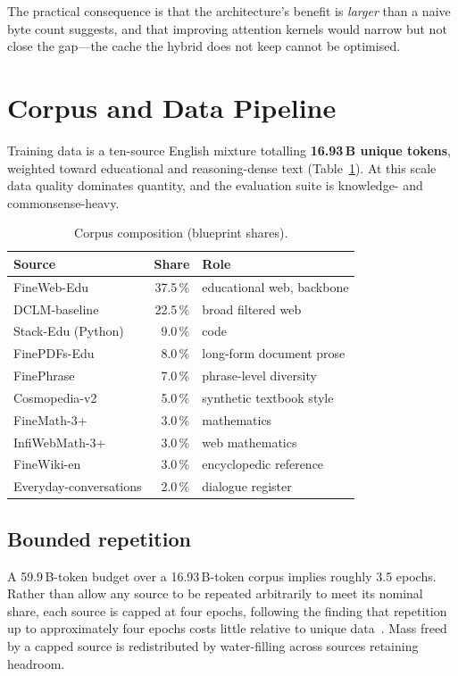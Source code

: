 \documentclass[conference]{IEEEtran}
\begin{document}
The practical consequence is that the architecture's benefit is
\emph{larger} than a naive byte count suggests, and that improving attention
kernels would narrow but not close the gap---the cache the hybrid does not keep
cannot be optimised.

\section{Corpus and Data Pipeline}

Training data is a ten-source English mixture totalling \textbf{16.93\,B unique
tokens}, weighted toward educational and reasoning-dense text
(Table~\ref{tab:corpus}). At this scale data quality dominates quantity, and the
evaluation suite is knowledge- and commonsense-heavy.

\begin{table}[t]
\caption{Corpus composition (blueprint shares).}
\label{tab:corpus}
\centering
\begin{tabular}{@{}lrl@{}}
\toprule
\textbf{Source} & \textbf{Share} & \textbf{Role} \\
\midrule
FineWeb-Edu            & 37.5\,\% & educational web, backbone \\
DCLM-baseline          & 22.5\,\% & broad filtered web \\
Stack-Edu (Python)     & 9.0\,\%  & code \\
FinePDFs-Edu           & 8.0\,\%  & long-form document prose \\
FinePhrase             & 7.0\,\%  & phrase-level diversity \\
Cosmopedia-v2          & 5.0\,\%  & synthetic textbook style \\
FineMath-3+            & 3.0\,\%  & mathematics \\
InfiWebMath-3+         & 3.0\,\%  & web mathematics \\
FineWiki-en            & 3.0\,\%  & encyclopedic reference \\
Everyday-conversations & 2.0\,\%  & dialogue register \\
\bottomrule
\end{tabular}
\end{table}

\subsection{Bounded repetition}

A 59.9\,B-token budget over a 16.93\,B-token corpus implies roughly 3.5 epochs.
Rather than allow any source to be repeated arbitrarily to meet its nominal
share, each source is capped at four epochs, following the finding that
repetition up to approximately four epochs costs little relative to unique
data~\cite{muennighoff}. Mass freed by a capped source is redistributed by
water-filling across sources retaining headroom.
\end{document}
